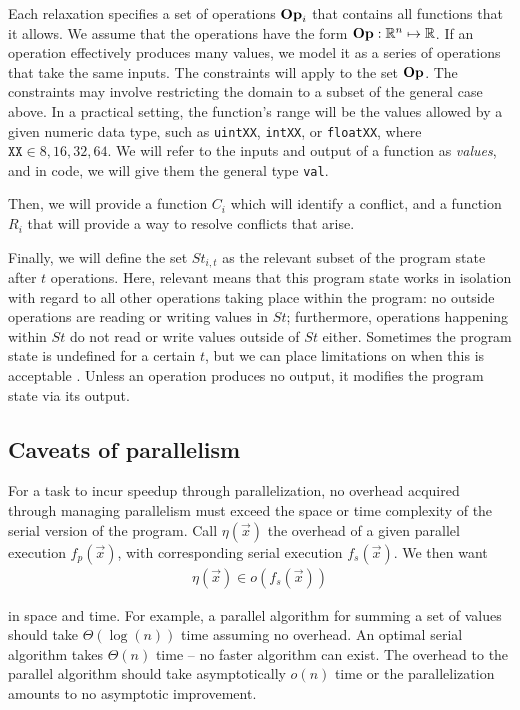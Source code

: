 Each relaxation specifies a set of operations $\mathrm{\mathbf{Op}}_{i}$ that contains all
functions that it allows. We assume that the operations have the form $\mathrm{\mathbf{Op}}:
\mathbb{R}^{n} \mapsto \mathbb{R}$. If an operation effectively produces many
values, we model it as a series of operations that take the same inputs.  The
constraints will apply to the set $\mathrm{\mathbf{Op}}$. The constraints may involve restricting
the domain to a subset of the general case above. In a practical setting, the
function's range will be the values allowed by a given numeric data type, such
as \texttt{uintXX}, \texttt{intXX}, or \texttt{float{XX}}, where $\texttt{XX}
\in {8, 16, 32, 64}$. We will refer to the inputs and output of a function as
\emph{values}, and in code, we will give them the general type \texttt{val}.

Then, we will provide a function $C_i$ which will identify a conflict, and a
function $R_i$ that will provide a way to resolve conflicts that arise.

Finally, we will define the set $St_{i,t}$ as the relevant subset of the program
state after $t$ operations. Here, relevant means that this program state works
in isolation with regard to all other operations taking place within the
program: no outside operations are reading or writing values in $St$;
furthermore, operations happening within $St$ do not read or write values
outside of $St$ either. Sometimes the program state is undefined for a certain
$t$, but we can place limitations on when this is acceptable \cite{timeclocks}.
Unless an operation produces no output, it modifies the program state via its
output.

\subsection{Caveats of parallelism}
For a task to incur speedup through parallelization, no overhead acquired
through managing parallelism must exceed the space or time complexity of the
serial version of the program. Call $\eta(\vec{x})$ the overhead of a given
parallel execution $f_p(\vec{x})$, with corresponding serial execution
$f_s(\vec{x})$. We then want
\begin{align*}
    \eta(\vec{x}) \in o(f_s(\vec{x}))
\end{align*}

in space and time. For example, a parallel algorithm for summing a set of values
should take $\Theta(\log(n))$ time assuming no overhead. An optimal serial
algorithm takes $\Theta(n)$ time -- no faster algorithm can exist. The overhead
to the parallel algorithm should take asymptotically $o(n)$ time or the
parallelization amounts to no asymptotic improvement.

